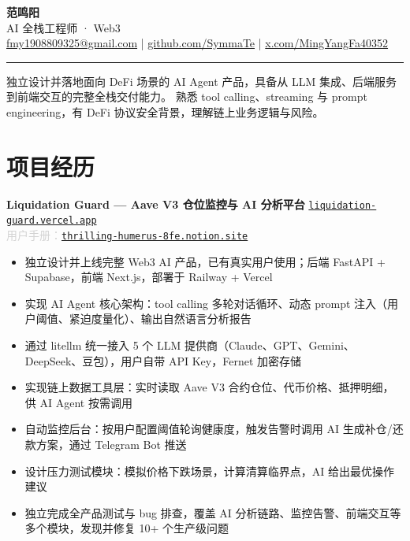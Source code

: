 \documentclass[9.5pt, a4paper]{article}
\begin{document}

\begin{center}
  {\Huge\bfseries\color{accent} 范鸣阳}\\[3pt]
  {\large\color{lightgray} AI 全栈工程师 · Web3}\\[4pt]
  \small
  \href{mailto:fmy1908809325@gmail.com}{fmy1908809325@gmail.com}
  \quad\textcolor{rulegray}{|}\quad
  \href{https://github.com/SymmaTe}{github.com/SymmaTe}
  \quad\textcolor{rulegray}{|}\quad
  \href{https://x.com/MingYangFa40352}{x.com/MingYangFa40352}
\end{center}

\vspace{1pt}
\noindent\color{rulegray}\rule{\textwidth}{0.6pt}
\vspace{2pt}

\noindent\small\color{lightgray}
独立设计并落地面向 DeFi 场景的 AI Agent 产品，具备从 LLM 集成、后端服务到前端交互的完整全栈交付能力。
熟悉 tool calling、streaming 与 prompt engineering，有 DeFi 协议安全背景，理解链上业务逻辑与风险。

\vspace{1pt}


\section{项目经历}

\noindent\textbf{Liquidation Guard — Aave V3 仓位监控与 AI 分析平台} \hfill
\href{https://liquidation-guard.vercel.app}{\small\texttt{liquidation-guard.vercel.app}}\\
\noindent\textcolor{lightgray}{\small 用户手册：\href{https://thrilling-humerus-8fe.notion.site/Liquidation-Guard-98045d5666c245d2bad2f1758b7bce31}{\texttt{thrilling-humerus-8fe.notion.site}}}

\begin{itemize}
  \item 独立设计并上线完整 Web3 AI 产品，已有真实用户使用；后端 FastAPI + Supabase，前端 Next.js，部署于 Railway + Vercel
  \item 实现 AI Agent 核心架构：tool calling 多轮对话循环、动态 prompt 注入（用户阈值、紧迫度量化）、输出自然语言分析报告
  \item 通过 litellm 统一接入 5 个 LLM 提供商（Claude、GPT、Gemini、DeepSeek、豆包），用户自带 API Key，Fernet 加密存储
  \item 实现链上数据工具层：实时读取 Aave V3 合约仓位、代币价格、抵押明细，供 AI Agent 按需调用
  \item 自动监控后台：按用户配置阈值轮询健康度，触发告警时调用 AI 生成补仓/还款方案，通过 Telegram Bot 推送
  \item 设计压力测试模块：模拟价格下跌场景，计算清算临界点，AI 给出最优操作建议
  \item 独立完成全产品测试与 bug 排查，覆盖 AI 分析链路、监控告警、前端交互等多个模块，发现并修复 10+ 个生产级问题
\end{itemize}
\end{document}
